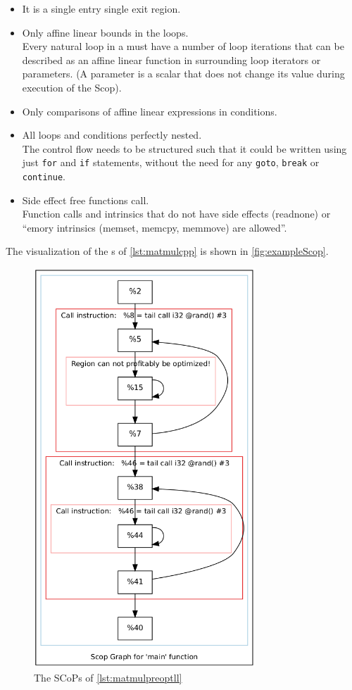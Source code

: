 \begin{itemize}
    \item It is a single entry single exit region.
    \item Only affine linear bounds in the loops.\\
        Every natural loop in a \scop must have a number of loop iterations that can be described as an affine linear function in surrounding loop iterators or parameters. (A parameter is a scalar that does not change its value during execution of the Scop).
    \item Only comparisons of affine linear expressions in conditions.
    \item All loops and conditions perfectly nested.\\
        The control flow needs to be structured such that it could be written using just \texttt{for} and \texttt{if} statements, without the need for any \texttt{goto}, \texttt{break} or \texttt{continue}.
    \item Side effect free functions call.\\
        Function calls and intrinsics that do not have side effects (readnone) or \enquote{emory intrinsics (memset, memcpy, memmove) are allowed}.
\end{itemize}
The visualization of the \scop s of \autoref{lst:matmulcpp} is shown in \autoref{fig:exampleScop}.
\begin{figure}[!ht]
    \centering
    \caption{The SCoPs of \autoref{lst:matmulpreoptll}}
    \label{fig:exampleScop}
    \includegraphics[height=15cm]{gfx/matmulScops.png}
\end{figure}
